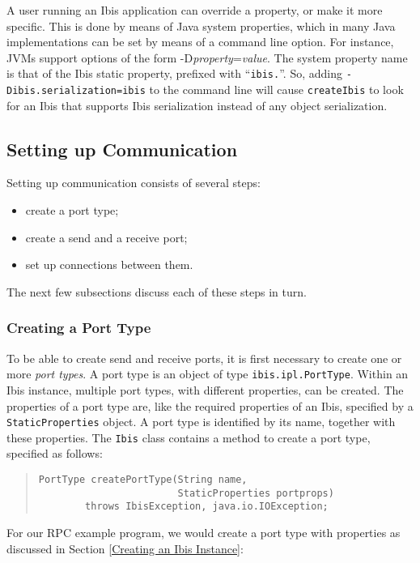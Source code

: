 \documentclass[10pt]{article}
\begin{document}
A user running an Ibis application can override a property, or make
it more specific. This is done by means of Java system properties,
which in many Java implementations can be set by means of a command
line option.  For instance, JVMs support options of the form
-D\emph{property}=\emph{value}.  The system property name is that
of the Ibis static property, prefixed with ``\verb+ibis.+''.  So,
adding \verb+-Dibis.serialization=ibis+ to the command line will cause
\verb+createIbis+ to look for an Ibis that supports Ibis serialization
instead of any object serialization.

\subsection{Setting up Communication}

Setting up communication consists of several steps:
\begin{itemize}
\item
create a port type;
\item
create a send and a receive port;
\item
set up connections between them.
\end{itemize}

The next few subsections discuss each of these steps in turn.

\subsubsection{Creating a Port Type}

To be able to create send and receive ports, it is first necessary
to create one or more \emph{port types}.
A port type is an object
of type \verb+ibis.ipl.PortType+.
Within an Ibis instance,
multiple port types, with different properties, can be created.
The properties of a port type are, like the required properties
of an Ibis, specified by a \verb+StaticProperties+ object.
A port type is identified by its name, together with these properties.
The \verb+Ibis+ class contains a method to create a port type,
specified as follows:
\begin{quote}
\begin{verbatim}
PortType createPortType(String name,
                        StaticProperties portprops)
        throws IbisException, java.io.IOException;
\end{verbatim}
\end{quote}

For our RPC example program, we would create a port type with properties
as discussed in Section \ref{Creating an Ibis Instance}:
\end{document}

